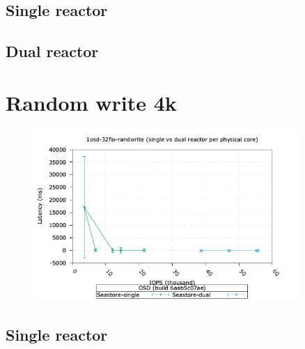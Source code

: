 \subsection{Single reactor}

\subsection{Dual reactor}

\pagebreak

\section{Random write 4k}

\begin{figure}[ht!]
  \centering
  \includegraphics[width=0.9\textwidth]{seastore_1osd_32fio_randwrite_iops_vs_lat.png}
\end{figure}

%
\subsection{Single reactor}

